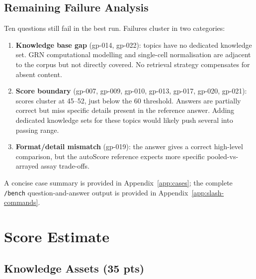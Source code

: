 \documentclass[12pt, a4paper]{article}
\begin{document}
\subsection{Remaining Failure Analysis}

Ten questions still fail in the best run.  Failures cluster in two categories:

\begin{enumerate}
  \item \textbf{Knowledge base gap} (gp-014, gp-022): topics have no dedicated knowledge set.
        GRN computational modelling and single-cell normalisation are adjacent to the corpus
        but not directly covered. No retrieval strategy compensates for absent content.
  \item \textbf{Score boundary} (gp-007, gp-009, gp-010, gp-013, gp-017, gp-020, gp-021):
        scores cluster at 45--52, just below the 60 threshold. Answers are partially correct
        but miss specific details present in the reference answer. Adding dedicated knowledge
        sets for these topics would likely push several into passing range.
  \item \textbf{Format/detail mismatch} (gp-019): the answer gives a correct high-level
        comparison, but the autoScore reference expects more specific pooled-vs-arrayed
        assay trade-offs.
\end{enumerate}

A concise case summary is provided in Appendix~\ref{app:cases}; the complete
\texttt{/bench} question-and-answer output is provided in Appendix~\ref{app:slash-commands}.

\section{Score Estimate}

\subsection{Knowledge Assets (35 pts)}
\end{document}
